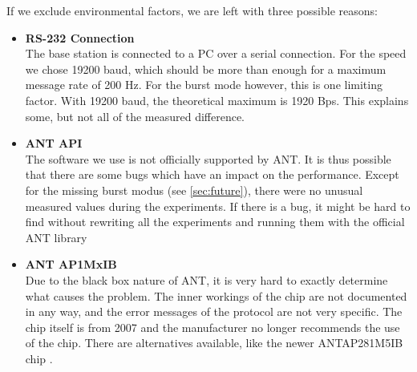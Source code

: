 If we exclude environmental factors, we are left with three possible reasons:
\begin{itemize}
	\item{\textbf{RS-232 Connection}} \hfill \\ The base station is connected to a PC over a serial connection. For the speed we chose 19200 baud, which should be more than enough for a maximum message rate of 200 Hz. For the burst mode however, this is one limiting factor. With 19200 baud, the theoretical maximum is 1920 Bps. This explains some, but not all of the measured difference.
	
	\item{\textbf{ANT API}} \hfill \\ The software we use is not officially supported by ANT. It is thus possible that there are some bugs which have an impact on the performance. Except for the missing burst modus (see \ref{sec:future}), there were no unusual measured values during the experiments. If there is a bug, it might be hard to find without rewriting all the experiments and running them with the official ANT library \cite{ANTWinLib}
	
	\item{\textbf{ANT AP1MxIB}} \hfill \\ Due to the black box nature of ANT, it is very hard to exactly determine what causes the problem. The inner workings of the chip are not documented in any way, and the error messages of the protocol are not very specific. The chip itself is from 2007 and the manufacturer no longer recommends the use of the chip\cite{AP1page}. There are alternatives available, like the newer ANTAP281M5IB chip \cite{AP2Datasheet}.
\end{itemize}
\newpage
